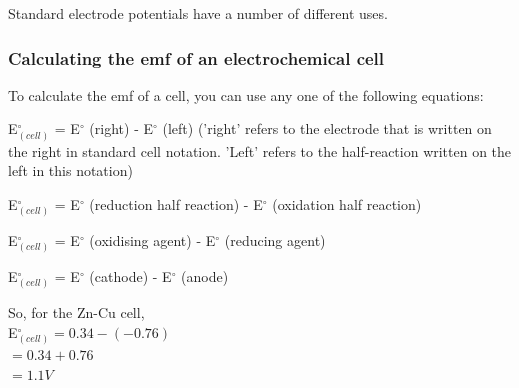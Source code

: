 Standard electrode potentials have a number of different uses.


\subsubsection{Calculating the emf of an electrochemical cell}

To calculate the emf of a cell, you can use any one of the following equations:

E$^{\circ}_{(cell)}$ = E$^{\circ}$ (right) - E$^{\circ}$ (left) ('right' refers to the electrode that is written on the right in standard cell notation. 'Left' refers to the half-reaction written on the left in this notation) 

E$^{\circ}_{(cell)}$ = E$^{\circ}$ (reduction half reaction) - E$^{\circ}$ (oxidation half reaction)

E$^{\circ}_{(cell)}$ = E$^{\circ}$ (oxidising agent) - E$^{\circ}$ (reducing agent)

E$^{\circ}_{(cell)}$ = E$^{\circ}$ (cathode) - E$^{\circ}$ (anode)


So, for the Zn-Cu cell, \\

E$^{\circ}_{(cell)} = 0.34 - (-0.76)$\\

$= 0.34 + 0.76$\\

$= 1.1 V$\\



